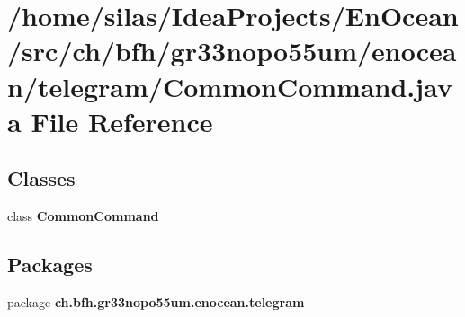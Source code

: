 \section{/home/silas/\+Idea\+Projects/\+En\+Ocean/src/ch/bfh/gr33nopo55um/enocean/telegram/\+Common\+Command.java File Reference}
\label{CommonCommand_8java}
\subsection*{Classes}
\begin{DoxyCompactItemize}
\item 
class {\bf Common\+Command}
\end{DoxyCompactItemize}
\subsection*{Packages}
\begin{DoxyCompactItemize}
\item 
package {\bf ch.\+bfh.\+gr33nopo55um.\+enocean.\+telegram}
\end{DoxyCompactItemize}
